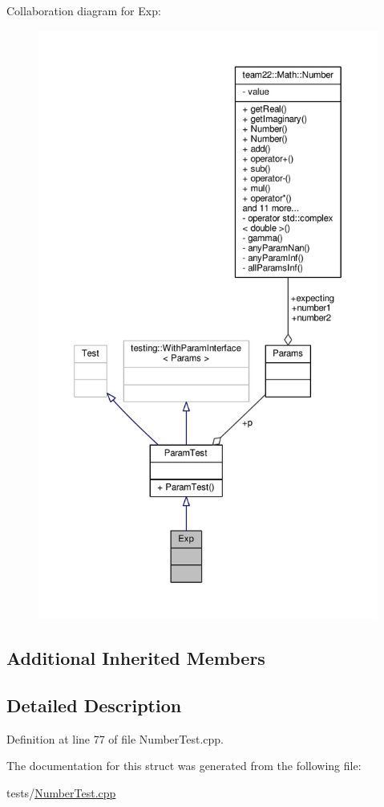 Collaboration diagram for Exp\+:
\nopagebreak
\begin{figure}[H]
\begin{center}
\leavevmode
\includegraphics[height=550pt]{struct_exp__coll__graph}
\end{center}
\end{figure}
\subsection*{Additional Inherited Members}


\subsection{Detailed Description}


Definition at line 77 of file Number\+Test.\+cpp.



The documentation for this struct was generated from the following file\+:\begin{DoxyCompactItemize}
\item 
tests/\hyperlink{_number_test_8cpp}{Number\+Test.\+cpp}\end{DoxyCompactItemize}
